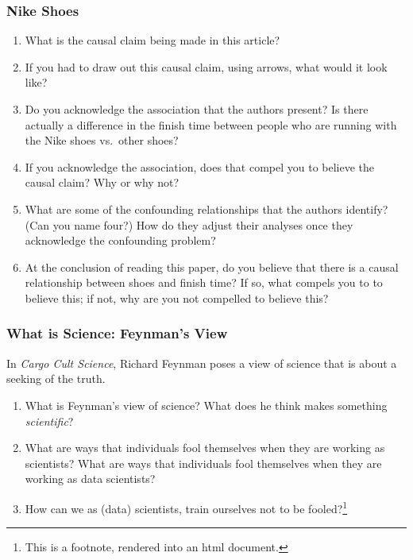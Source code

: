 \documentclass[
]{article}
\providecommand{\tightlist}{%
  \setlength{\itemsep}{0pt}\setlength{\parskip}{0pt}}
\begin{document}
\hypertarget{nike-shoes}{%
\subsubsection{Nike Shoes}\label{nike-shoes}}

\begin{enumerate}
\def\labelenumi{\arabic{enumi}.}
\tightlist
\item
  What is the causal claim being made in this article?
\item
  If you had to draw out this causal claim, using arrows, what would it look like?
\item
  Do you acknowledge the association that the authors present? Is there actually a difference in the finish time between people who are running with the Nike shoes vs.~other shoes?
\item
  If you acknowledge the association, does that compel you to believe the causal claim? Why or why not?
\item
  What are some of the confounding relationships that the authors identify? (Can you name four?) How do they adjust their analyses once they acknowledge the confounding problem?
\item
  At the conclusion of reading this paper, do you believe that there is a causal relationship between shoes and finish time? If so, what compels you to to believe this; if not, why are you not compelled to believe this?
\end{enumerate}

\hypertarget{what-is-science-feynmans-view}{%
\subsubsection{What is Science: Feynman's View}\label{what-is-science-feynmans-view}}

In \emph{Cargo Cult Science}, Richard Feynman poses a view of science that is about a seeking of the truth.

\begin{enumerate}
\def\labelenumi{\arabic{enumi}.}
\tightlist
\item
  What is Feynman's view of science? What does he think makes something \emph{scientific}?
\item
  What are ways that individuals fool themselves when they are working as scientists? What are ways that individuals fool themselves when they are working as data scientists?
\item
  How can we as (data) scientists, train ourselves not to be fooled?\footnote{This is a footnote, rendered into an html document.}
\end{enumerate}
\end{document}

